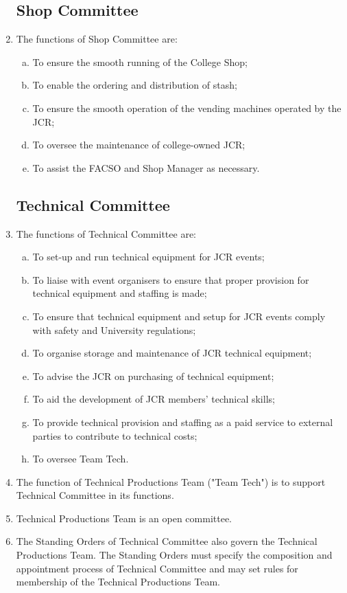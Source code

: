 \documentclass[12pt]{article}  %
\begin{document}
\begin{enumerate}
    \subsection{Shop Committee}
    \item The functions of Shop Committee are:
    \begin{enumerate}[(a)]
        \item To ensure the smooth running of the College Shop;
        \item To enable the ordering and distribution of stash;
        \item To ensure the smooth operation of the vending machines operated by the JCR;
        \item To oversee the maintenance of college-owned JCR;
        \item To assist the FACSO and Shop Manager as necessary.
    \end{enumerate}
    \subsection{Technical Committee}
    \item The functions of Technical Committee are:
    \begin{enumerate}[(a)]
        \item To set-up and run technical equipment for JCR events;
        \item To liaise with event organisers to ensure that proper provision for technical equipment and staffing is made;
        \item To ensure that technical equipment and setup for JCR events comply with safety and University regulations;
        \item To organise storage and maintenance of JCR technical equipment;
        \item To advise the JCR on purchasing of technical equipment;
        \item To aid the development of JCR members' technical skills;
        \item To provide technical provision and staffing as a paid service to external parties to contribute to technical costs;
        \item To oversee Team Tech.
    \end{enumerate}
    \item The function of Technical Productions Team ("Team Tech") is to support Technical Committee in its functions.
    \item Technical Productions Team is an open committee.
    \item The Standing Orders of Technical Committee also govern the Technical Productions Team. The Standing Orders must specify the composition and appointment process of Technical Committee and may set rules for membership of the Technical Productions Team.

\end{enumerate}
\end{document}

